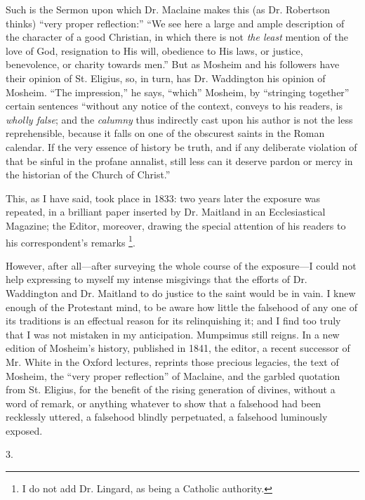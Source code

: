 Such is the Sermon upon which Dr. Maclaine makes this
(as Dr. Robertson thinks) ``very proper
reflection:'' ``We see here a large and ample
description of the character of a good Christian, in
which there is not \emph{the least} mention of the love
of God, resignation to His will, obedience to His laws,
or justice, benevolence, or charity towards men.''
But as Mosheim and his followers have their opinion of
St. Eligius, so, in turn, has Dr. Waddington his opinion
of Mosheim. ``The impression,'' he says,
``which'' Mosheim, by ``stringing
together'' certain sentences ``without any notice
of the context, conveys to his readers, is \emph{wholly
false}; and the \emph{calumny} thus indirectly cast
upon his author is not the less reprehensible, because it
falls on one of the obscurest saints in the Roman
calendar. If the very essence of history be truth, and if
any deliberate violation of that be sinful in the profane
annalist, still less can it deserve pardon or mercy in
the historian of the Church of Christ.''

This, as I have said, took place in 1833: two years
later the exposure was repeated, in a brilliant paper
inserted by Dr. Maitland in an Ecclesiastical Magazine;
the Editor, moreover, drawing the special attention of
his readers to his correspondent's remarks \footnote{I do not add Dr. Lingard, as
being a Catholic authority.}.

However, after all—after surveying the whole
course of the exposure—I could not help expressing
to myself my intense misgivings that the efforts of Dr.
Waddington and Dr. Maitland to do justice to the saint
would be in vain. I knew enough of the Protestant mind,
to be aware how little the falsehood of any one of its
traditions is an effectual reason for its relinquishing
it; and I find too truly that I was not mistaken in my
anticipation. Mumpsimus still reigns. In a new edition of
Mosheim's history, published in 1841, the editor, a
recent successor of Mr. White in the Oxford lectures,
reprints those precious legacies, the text of Mosheim,
the ``very proper reflection'' of Maclaine, and
the garbled quotation from St. Eligius, for the benefit
of the rising generation of divines, without a word of
remark, or anything whatever to show that a falsehood had
been recklessly uttered, a falsehood blindly perpetuated,
a falsehood luminously exposed.

3.

